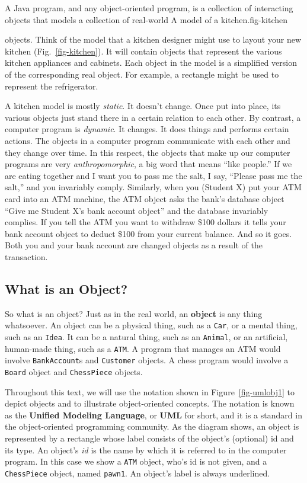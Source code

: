 A Java program, and any object-oriented program, is a collection of
interacting objects that models a collection of real-world
 {A model of a kitchen.}{fig-kitchen}

objects. Think of the model that a kitchen designer might use to
layout your new kitchen (Fig.~\ref{fig-kitchen}).  It will contain
objects that represent the various kitchen appliances and
cabinets. Each object in the model is a simplified version of the
corresponding real object.  For example, a rectangle might be used to
represent the refrigerator.

A kitchen model is mostly {\em static}. It doesn't change. Once put
into place, its various objects just stand there in a certain relation
to each other. By contrast, a computer program is {\em dynamic}. It
changes. It does things and performs certain actions.  The objects in
a computer program communicate with each other and they change over
time. In this respect, the objects that make up our computer programs
are very {\em anthropomorphic}, a big word that means ``like people.''
If we are eating together and I want you to pass me the salt, I say,
``Please pass me the salt,'' and you invariably comply.  Similarly,
when you (Student X) put your ATM card into an ATM machine, the ATM
object asks the bank's database object ``Give me Student X's bank
account object'' and the database invariably complies.  If you tell
the ATM you want to withdraw \$100 dollars it tells your bank account
object to deduct \$100 from your current balance. And so it goes.
Both you and your bank account are changed objects as a result of
the transaction.

\subsection{What is an Object?}

So what is an object? Just as in the real world, an {\bf object} is
any thing whatsoever. An object can be a physical thing, such as a
{\tt Car}, or a mental thing, such as an {\tt Idea}.  It can be a
natural thing, such as an {\tt Animal}, or an artificial, human-made
thing, such as a {\tt ATM}. A program that manages an ATM would
involve {\tt BankAccount}s and {\tt Customer} objects. A chess program
would involve a {\tt Board} object and {\tt ChessPiece} objects.

Throughout this text, we will use the notation shown in
Figure~\ref{fig-umlobj1} to depict objects and to illustrate
object-oriented concepts. The notation is known as the {\bf Unified
Modeling Language}, or {\bf UML} for short, and it is a standard in
the object-oriented programming community.  As the diagram shows, an
object is represented by a rectangle whose label consists of the
object's (optional) id and its type. An object's {\em id} is the name
by which it is referred to in the computer program. In this case we
show a {\tt ATM} object, who's id is not given, and a {\tt ChessPiece}
object, named {\tt pawn1}. An object's label is always underlined.

